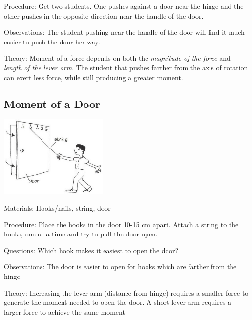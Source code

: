 \begin{multicols}{2}
\begin{description*}
\item[Procedure:]{Get two students. One pushes against a door near the hinge and the other pushes in the opposite direction near the handle of the door.}
\item[Observations:]{The student pushing near the handle of the door will find it much easier to push the door her way.}
\item[Theory:]{Moment of a force depends on both the \emph{magnitude of the force} and \emph{length of the lever arm}. The student that pushes farther from the axis of rotation can exert less force, while still producing a greater moment.}
\end{description*}

\columnbreak

\subsection{Moment of a Door}

\begin{center}
\includegraphics[width=0.4\textwidth]{./img/vso/doors-levers.jpg}
\end{center}

\begin{description*}
\item[Materials:]{Hooks/nails, string, door}
\item[Procedure:]{Place the hooks in the door 10-15 cm apart. Attach a string to the hooks, one at a time and try to pull the door open.}
\item[Questions:]{Which hook makes it easiest to open the door?}
\item[Observations:]{The door is easier to open for hooks which are farther from the hinge.}
\item[Theory:]{Increasing the lever arm (distance from hinge) requires a smaller force to generate the moment needed to open the door. A short lever arm requires a larger force to achieve the same moment.}
\end{description*}


\end{multicols}
